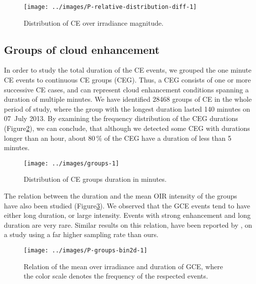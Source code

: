 \documentclass[preprint, 5p,
authoryear]{elsarticle} %
\begin{document}
\begin{figure}

{\centering \texttt{[image: ../images/P-relative-distribution-diff-1]} 

}

\caption{Distribution of CE over irradiance magnitude.}\label{fig:ovir-distribution}
\end{figure}

\hypertarget{groups-of-cloud-enhancement}{%
\subsection{Groups of cloud
enhancement}\label{groups-of-cloud-enhancement}}

In order to study the total duration of the CE events, we grouped the
one minute CE events to continuous CE groups (CEG). Thus, a CEG consists
of one or more successive CE cases, and can represent cloud enhancement
conditions spanning a duration of multiple minutes. We have identified
28468 groups of CE in the whole period of study, where the group with
the longest duration lasted 140 minutes on 07~July 2013. By examining
the frequency distribution of the CEG durations
(Figure\nobreakspace{}\ref{fig:ceg-duration-distribution}), we can
conclude, that although we detected some CEG with durations longer than
an hour, about \(80\,\%\) of the CEG have a duration of less than 5
minutes.

\begin{figure}

{\centering \texttt{[image: ../images/groups-1]} 

}

\caption{Distribution of CE groups duration in minutes.}\label{fig:ceg-duration-distribution}
\end{figure}

The relation between the duration and the mean OIR intensity of the
groups have also been studied (Figure\nobreakspace{}\ref{fig:group-2d}).
We observed that the GCE events tend to have either long duration, or
large intensity. Events with strong enhancement and long duration are
very rare. Similar results on this relation, have been reported by
\citet{Zhang2018}, on a study using a far higher sampling rate than
ours.

\begin{figure}

{\centering \texttt{[image: ../images/P-groups-bin2d-1]} 

}

\caption{Relation of the mean over irradiance and duration of GCE, where the color scale denotes the frequency of the respected events.}\label{fig:group-2d}
\end{figure}
\end{document}
